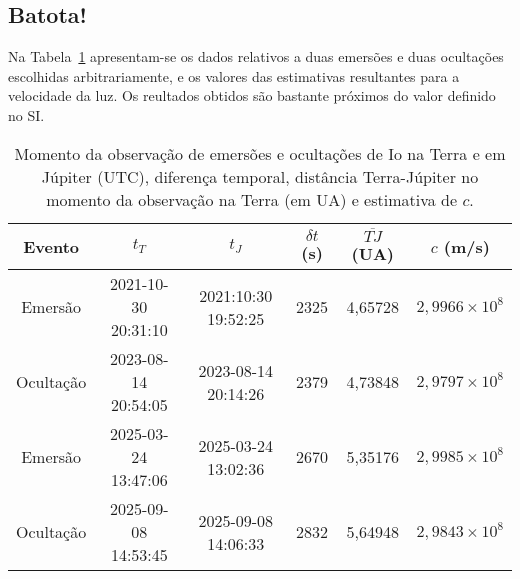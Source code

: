 \documentclass[]{article}
\begin{document}
\subsection{Batota!}
Na Tabela~\ref{tab:aa} apresentam-se os dados relativos a duas emersões e duas
ocultações escolhidas arbitrariamente, e os valores das estimativas resultantes
para a velocidade da luz.  Os reultados obtidos são bastante próximos do valor
definido no SI.
\begin{table}[htb]
  \begin{center}
    \begin{tabular}{cccccc}
      \hline
      Evento & $t_T$ & $t_J$ & $\delta t$ (s) & $\overline{TJ}$ (UA) & $c$ (m/s) \\
      \hline
      Emersão  & 2021-10-30 20:31:10 & 2021:10:30 19:52:25 & 2325 & 4,65728 & $2,9966\times10^8$\\
      Ocultação& 2023-08-14 20:54:05 & 2023-08-14 20:14:26 & 2379 & 4,73848 & $2,9797\times10^8$\\
      Emersão  & 2025-03-24 13:47:06 & 2025-03-24 13:02:36 & 2670 & 5,35176 & $2,9985\times10^8$\\
      Ocultação& 2025-09-08 14:53:45 & 2025-09-08 14:06:33 & 2832 & 5,64948 & $2,9843\times10^8$\\
      \hline
    \end{tabular}
  \end{center}
  \caption{\label{tab:aa}Momento da observação de emersões e ocultações de Io na
  Terra e em Júpiter (UTC), diferença temporal, distância Terra-Júpiter no
momento da observação na Terra (em UA) e estimativa de $c$.}
\end{table}
\end{document}
